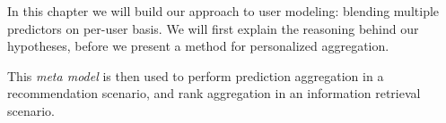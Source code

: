 In this chapter we will build our approach to user modeling:
blending multiple predictors on per-user basis.
We will first explain the reasoning behind our hypotheses,
before we present a method for personalized aggregation.

This \emph{meta model} is then used to perform prediction aggregation in a recommendation scenario,
and rank aggregation in an information retrieval scenario.






